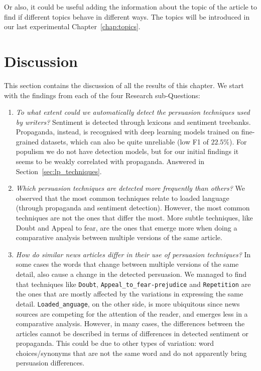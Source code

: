 Or also, it could be useful adding the information about the topic of the article to find if different topics behave in different ways. The topics will be introduced in our last experimental Chapter~\ref{chap:topics}.

\section{\statusgreen Discussion}

This section contains the discussion of all the results of this chapter. We start with the findings from each of the four Research sub-Questions:

\begin{enumerate}[label={\textbf{RQ2.\arabic*:}},leftmargin=2cm]
    \item \emph{To what extent could we automatically detect the persuasion techniques used by writers?} Sentiment is detected through lexicons and sentiment treebanks. Propaganda, instead, is recognised with deep learning models trained on fine-grained datasets, which can also be quite unreliable (low F1 of $22.5\%$). For populism we do not have detection models, but for our initial findings it seems to be weakly correlated with propaganda.
    Answered in Section~\ref{sec:lp_techniques}. %
    \item \emph{Which persuasion techniques are detected more frequently than others?} We observed that the most common techniques relate to loaded language (through propaganda and sentiment detection). However, the most common techniques are not the ones that differ the most. More subtle techniques, like Doubt and Appeal to fear, are the ones that emerge more when doing a comparative analysis between multiple versions of the same article.
    \item \emph{How do similar news articles differ in their use of persuasion techniques?} In some cases the words that change between multiple versions of the same detail, also cause a change in the detected persuasion. We managed to find that techniques like \texttt{Doubt}, \texttt{Appeal\_to\_fear-prejudice} and \texttt{Repetition} are the ones that are mostly affected by the variations in expressing the same detail.
    \texttt{Loaded\_anguage}, on the other side, is more ubiquitous since news sources are competing for the attention of the reader, and emerges less in a comparative analysis.
    However, in many cases, the differences between the articles cannot be described in terms of differences in detected sentiment or propaganda. This could be due to other types of variation: word choices/synonyms that are not the same word and do not apparently bring persuasion differences.

\end{enumerate}
